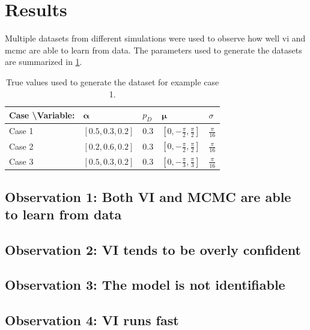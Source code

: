 \section{Results}
Multiple datasets from different simulations were used to observe how well \acrshort{vi} and \acrshort{mcmc} are able to learn from data. The parameters used to generate the datasets are summarized in \cref{tbl:example_params}.
\begin{table}[h]
\centering
\begin{tabular}{lllll}
\textbf{Case \textbackslash Variable:}   & $\boldsymbol{\alpha}$ & $p_D$ & $\boldsymbol{\mu}$                  & $\sigma$         \\ \hline
Case 1 & $[0.5, 0.3, 0.2]$     & $0.3$ & $[0, -\frac{\pi}{2}, \frac{\pi}{2}]$ & $\frac{\pi}{16}$ \\
Case 2 & $[0.2, 0.6, 0.2]$     & $0.3$ & $[0, -\frac{\pi}{2}, \frac{\pi}{2}]$ & $\frac{\pi}{16}$ \\
Case 3 & $[0.5, 0.3, 0.2]$     & $0.3$ & $[0, -\frac{\pi}{3}, \frac{\pi}{3}]$ & $\frac{\pi}{16}$ \\
\end{tabular}
\caption{True values used to generate the dataset for example case 1.}
\label{tbl:example_params}
\end{table}

\subsection{Observation 1: Both VI and MCMC are able to learn from data}
\subsection{Observation 2: VI tends to be overly confident}
\subsection{Observation 3: The model is not identifiable}
\subsection{Observation 4: VI runs fast}


